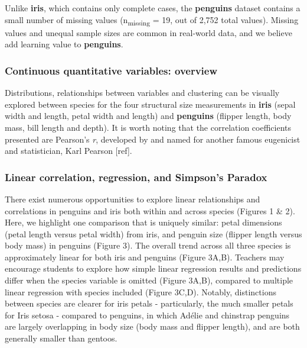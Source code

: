 Unlike \textbf{iris}, which contains only complete cases, the
\textbf{penguins} dataset contains a small number of missing values
(n\textsubscript{missing} = 19, out of 2,752 total values). Missing
values and unequal sample sizes are common in real-world data, and we
believe add learning value to \textbf{penguins}.

\hypertarget{continuous-quantitative-variables-overview}{%
\subsubsection{Continuous quantitative variables:
overview}\label{continuous-quantitative-variables-overview}}

Distributions, relationships between variables and clustering can be
visually explored between species for the four structural size
measurements in \textbf{iris} (sepal width and length, petal width and
length) and \textbf{penguins} (flipper length, body mass, bill length
and depth). It is worth noting that the correlation coefficients
presented are Pearson's \emph{r}, developed by and named for another
famous eugenicist and statistician, Karl Pearson {[}ref{]}.

\hypertarget{linear-correlation-regression-and-simpsons-paradox}{%
\subsubsection{Linear correlation, regression, and Simpson's
Paradox}\label{linear-correlation-regression-and-simpsons-paradox}}

There exist numerous opportunities to explore linear relationships and
correlations in penguins and iris both within and across species
(Figures 1 \& 2). Here, we highlight one comparison that is uniquely
similar: petal dimensions (petal length versus petal width) from iris,
and penguin size (flipper length versus body mass) in penguins (Figure
3). The overall trend across all three species is approximately linear
for both iris and penguins (Figure 3A,B). Teachers may encourage
students to explore how simple linear regression results and predictions
differ when the species variable is omitted (Figure 3A,B), compared to
multiple linear regression with species included (Figure 3C,D). Notably,
distinctions between species are clearer for iris petals - particularly,
the much smaller petals for Iris setosa - compared to penguins, in which
Adélie and chinstrap penguins are largely overlapping in body size (body
mass and flipper length), and are both generally smaller than gentoos.

